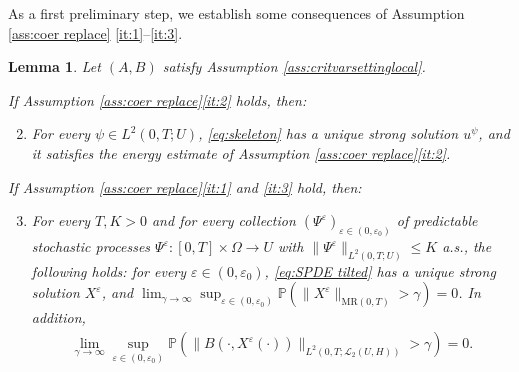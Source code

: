 \documentclass{amsart}
\renewcommand{\MR}{\mathrm{MR}}
\newcommand{\UH}{\mathscr{L}_2(U,H)}
\newcommand{\<}{\langle}
\newcommand{\?}{\rangle}
\newcommand{\col}{\colon}
\newcommand{\bphieps}{\Psi^{\eps}}
\theoremstyle{plain}
\theoremstyle{remark}
\theoremstyle{plain}
\newtheorem{lemma}[theorem]{Lemma}
\numberwithin{equation}{section}
\renewcommand{\P}{\mathbb{P}}
\newcommand{\Om}{\Omega}
\newcommand{\eps}{\varepsilon}
\begin{document}
As a first preliminary step, we establish some  consequences of Assumption \ref{ass:coer replace} \ref{it:1}--\ref{it:3}. 
\begin{lemma}\label{lem:consequences ass I-III} 
Let $(A,B)$ satisfy  Assumption  \ref{ass:critvarsettinglocal}.   

If Assumption \ref{ass:coer replace}\ref{it:2} holds, then:
\begin{enumerate}[label=\textit{(\Roman**)},ref=\textit{(\Roman**)}]
\setcounter{enumi}{1}
\item\label{it:gen2}    For every $\psi\in L^2(0,T;U)$, \eqref{eq:skeleton} has a unique strong solution $u^{\psi}$, and it satisfies   the energy estimate of Assumption \ref{ass:coer replace}\ref{it:2}. 
\end{enumerate} 

If Assumption \ref{ass:coer replace}\ref{it:1} and \ref{it:3} hold, then: 
\begin{enumerate}[label=\textit{(\Roman**)},ref=\textit{(\Roman**)}]
\setcounter{enumi}{2}
\item\label{it:gen3}      For every $T,K>0$ and for every collection $(\bphieps)_{\eps\in(0,\eps_0)}$ of predictable stochastic processes $\bphieps\col [0,T]\times \Om\to U$ with   $\|\bphieps\|_{L^2(0,T;U)}\leq K$ a.s., the following holds: for every $\eps\in(0,\eps_0)$, \eqref{eq:SPDE tilted} has a unique strong solution $X^\eps$, and 
    $\lim_{\gamma\to\infty}\sup_{\eps\in(0,\eps_0)}\P(\|X^\eps\|_{\MR(0,T)}>\gamma)=0$. 
    In addition,
    \begin{align} 
\lim_{\gamma\to\infty} \sup_{\eps\in(0,\eps_0)}\P(\|B(\cdot,X^\eps(\cdot))\|_{L^2(0,T;\UH)}>\gamma)=0.\label{eq:lim2}
\end{align}      
\end{enumerate}  
\end{lemma}
\end{document}
